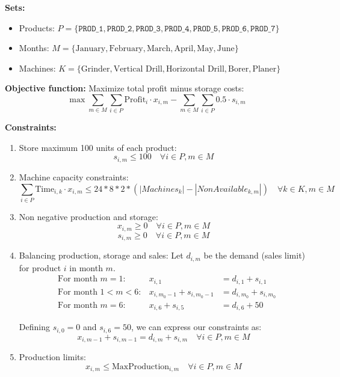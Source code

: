 \documentclass[a4paper,10pt]{article}
\begin{document}
\textbf{Sets:}
\begin{itemize}
  \item Products: \(P = \{\texttt{PROD\_1}, \texttt{PROD\_2}, \texttt{PROD\_3}, \texttt{PROD\_4}, \texttt{PROD\_5}, \texttt{PROD\_6}, \texttt{PROD\_7}\}\)
  \item Months: \(M = \{\text{January}, \text{February}, \text{March}, \text{April}, \text{May}, \text{June}\}\)
  \item Machines: \(K = \{\text{Grinder}, \text{Vertical Drill}, \text{Horizontal Drill}, \text{Borer}, \text{Planer}\}\)
\end{itemize}

\textbf{Objective function:}
Maximize total profit minus storage costs:
\[
  \max \sum_{m \in M} \sum_{i \in P} \text{Profit}_i \cdot x_{i,m} - \sum_{m \in M} \sum_{i \in P} 0.5 \cdot s_{i,m}  
\]

\textbf{Constraints:}
\begin{enumerate}
  \item Store maximum 100 units of each product:
  \[\boxed{s_{i,m} \leq 100 \quad \forall i \in P, m \in M}\]

  \item Machine capacity constraints:
  \[\boxed{\sum_{i \in P} \text{Time}_{i,k} \cdot x_{i,m} \leq 24*8*2*(|Machines_k| - |NonAvailable_{k,m}|)}\quad \forall k \in K, m \in M\] 

  \item Non negative production and storage:
  \[\boxed{x_{i,m} \geq 0 \quad \forall i \in P, m \in M}\]
  \[\boxed{s_{i,m} \geq 0 \quad \forall i \in P, m \in M}\]

  \item Balancing production, storage and sales:
  Let \(d_{i,m} \) be the demand (sales limit) for product \(i\) in month \(m\).
  \begin{align*}
    &\text{For month } m=1: & x_{i,1} &= d_{i,1} + s_{i,1} \\
    &\text{For month } 1 < m < 6: & x_{i,m_0-1} + s_{i,m_0-1} &= d_{i,m_0} + s_{i,m_0} \\
    &\text{For month } m=6: & x_{i,6} + s_{i,5} &= d_{i,6} + 50
  \end{align*}

  Defining \(s_{i,0}=0\) and \(s_{i,6}=50\), we can express our constraints as:
  \[\boxed{x_{i,m-1} + s_{i,m-1} = d_{i,m} + s_{i,m} \quad \forall i \in P, m \in M}\]

  \item Production limits:
  \[\boxed{x_{i,m} \leq \text{MaxProduction}_{i,m} \quad \forall i \in P, m \in M}\]

\end{enumerate}
\end{document}
